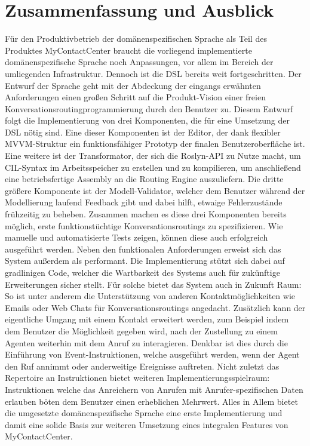 \chapter{Zusammenfassung und Ausblick}
Für den Produktivbetrieb der domänenspezifischen Sprache als Teil des Produktes MyContactCenter braucht die vorliegend implementierte domänenspezifische Sprache noch Anpassungen, vor allem im Bereich der umliegenden Infrastruktur. 
Dennoch ist die DSL bereits weit fortgeschritten. Der Entwurf der Sprache geht mit der Abdeckung der eingangs erwähnten Anforderungen einen großen Schritt auf die Produkt-Vision einer freien Konversationsroutingprogrammierung durch den Benutzer zu. Diesem Entwurf folgt die Implementierung von drei Komponenten, die für eine Umsetzung der DSL nötig sind. Eine dieser Komponenten ist der Editor, der dank flexibler MVVM-Struktur ein funktionsfähiger Prototyp der finalen Benutzeroberfläche ist. Eine weitere ist der Transformator, der sich die Roslyn-API zu Nutze macht, um CIL-Syntax im Arbeitsspeicher zu erstellen und zu kompilieren, um anschließend eine betriebsfertige Assembly an die Routing Engine auszuliefern. Die dritte größere Komponente ist der Modell-Validator, welcher dem Benutzer während der Modellierung laufend Feedback gibt und dabei hilft, etwaige Fehlerzustände frühzeitig zu beheben. Zusammen machen es diese drei Komponenten bereits möglich, erste funktionstüchtige Konversationsroutings zu spezifizieren. Wie manuelle und automatisierte Tests zeigen, können diese auch erfolgreich ausgeführt werden. Neben den funktionalen Anforderungen erweist sich das System außerdem als performant. Die Implementierung stützt sich dabei auf gradlinigen Code, welcher die Wartbarkeit des Systems auch für zukünftige Erweiterungen sicher stellt. Für solche bietet das System auch in Zukunft Raum: So ist unter anderem die Unterstützung von anderen Kontaktmöglichkeiten wie Emails oder Web Chats für Konversationsroutings angedacht. Zusätzlich kann der eigentliche Umgang mit einem Kontakt erweitert werden, zum Beispiel indem dem Benutzer die Möglichkeit gegeben wird, nach der Zustellung zu einem Agenten weiterhin mit dem Anruf zu interagieren. Denkbar ist dies durch die Einführung von Event-Instruktionen, welche ausgeführt werden, wenn der Agent den Ruf annimmt oder anderweitige Ereignisse auftreten. Nicht zuletzt das Repertoire an Instruktionen bietet weiteren Implementierungsspielraum: Instruktionen welche das Anreichern von Anrufen mit Anrufer-spezifischen Daten erlauben böten dem Benutzer einen erheblichen Mehrwert. Alles in Allem bietet die umgesetzte domänenspezifische Sprache eine erste Implementierung und damit eine solide Basis zur weiteren Umsetzung eines integralen Features von MyContactCenter.